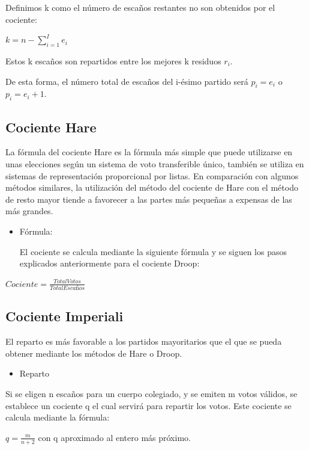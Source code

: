 \documentclass[12pt,a4paper,]{book}
\providecommand{\tightlist}{%
  \setlength{\itemsep}{0pt}\setlength{\parskip}{0pt}}
\numberwithin{dummy}{section}
\theoremstyle{ocrenumbox}
\theoremstyle{blacknumex}
\theoremstyle{blacknumbox}
\theoremstyle{ocrenum}
\theoremstyle{ocrenum}
\begin{document}
Definimos k como el número de escaños restantes no son obtenidos por el
cociente:

\({k=n-\sum _{i=1}^{I}e_{i}}\)

Estos k escaños son repartidos entre los mejores k residuos \({r_{i}}\).

De esta forma, el número total de escaños del i-ésimo partido será
\({p_{i}=e_{i}}\) o \({p_{i}=e_{i}+1}\).

\hypertarget{cociente-hare}{%
\subsection{Cociente Hare}\label{cociente-hare}}

La fórmula del cociente Hare es la fórmula más simple que puede
utilizarse en unas elecciones según un sistema de voto transferible
único, también se utiliza en sistemas de representación proporcional por
listas. En comparación con algunos métodos similares, la utilización del
método del cociente de Hare con el método de resto mayor tiende a
favorecer a las partes más pequeñas a expensas de las más grandes.

\begin{itemize}
\item
  Fórmula:

  El cociente se calcula mediante la siguiente fórmula y se siguen los
  pasos explicados anteriormente para el cociente Droop:
\end{itemize}

\(Cociente = \frac{Total Votos}{Total Escaños}\)

\hypertarget{cociente-imperiali}{%
\subsection{Cociente Imperiali}\label{cociente-imperiali}}

El reparto es más favorable a los partidos mayoritarios que el que se
pueda obtener mediante los métodos de Hare o Droop.

\begin{itemize}
\tightlist
\item
  Reparto
\end{itemize}

Si se eligen n escaños para un cuerpo colegiado, y se emiten m votos
válidos, se establece un cociente q el cual servirá para repartir los
votos. Este cociente se calcula mediante la fórmula:

\({q={\frac {m}{n+2}}}\) con q aproximado al entero más próximo.
\end{document}
